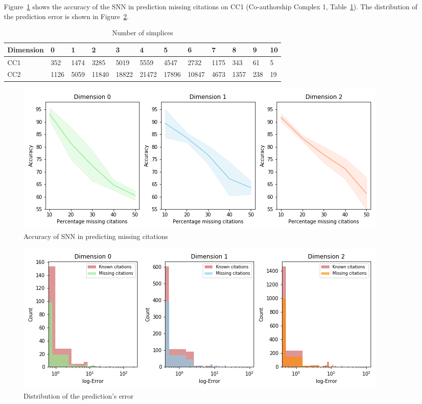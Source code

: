 Figure~\ref{fig:accuracy} shows the accuracy of the SNN in prediction missing citations on CC1 (Co-authorship Complex 1, Table~\ref{table:Simplices-coauthor}). The distribution of the prediction error is shown in Figure~\ref{fig:error}. 
\begin{table}
  \caption{%
  Number of simplices
  }
  \label{table:Simplices-coauthor}
  \centering
  \begin{tabular}{llllllllllll}
    \cmidrule(r){1-12}
    Dimension   & 0     & 1  & 2     & 3 & 4     & 5 & 6    & 7 & 8   & 9 & 10\\
    \midrule
    CC1 & 352  & 1474  & 3285  & 5019  & 5559  & 4547  & 2732  & 1175  & 343 & 61 & 5\\
    CC2 & 1126 & 5059 & 11840 & 18822 & 21472 & 17896  & 10847 & 4673 & 1357 & 238 & 19\\ 
    \bottomrule
  \end{tabular}
\end{table}
 
\begin{figure}[htbp]
  \centering 
\includegraphics[scale=0.4]{./figures/accuracy_network1.png}
 \caption{Accuracy of SNN in predicting missing citations } \label{fig:accuracy}
\end{figure}
\begin{figure}[htbp]

  \centering
 \hspace{-6cm}
 
\includegraphics[scale=0.4]{./figures/Error_dist_start150250_seed6666_notsee40.png}
  \caption{Distribution of the prediction's error} \label{fig:error}
\end{figure}

